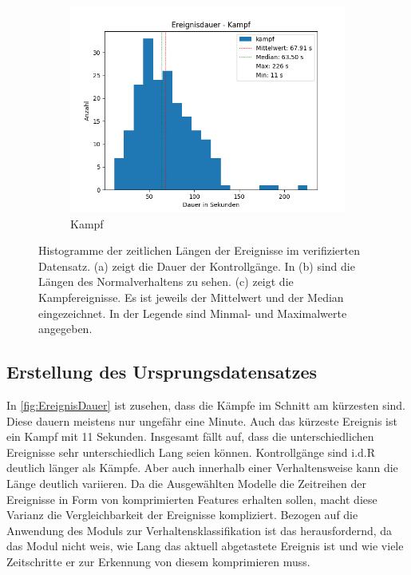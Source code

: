 \begin{figure}[htbp]
    \begin{subfigure}{.6\textwidth}
        \centering
        \includegraphics[width=1\linewidth]{img//Ereignisdauer/Auswertung Ereignisdauer kampf.png}
        \caption{Kampf}
        \label{fig:DauerNormal}
    \end{subfigure}
    \caption[Histogramme der zeitlichen Längen der Ereignisse im verifizierten Datensatz.]{Histogramme der zeitlichen Längen der Ereignisse im verifizierten Datensatz. (a) zeigt die Dauer der Kontrollgänge. In (b) sind die Längen des Normalverhaltens zu sehen. (c) zeigt die Kampfereignisse. Es ist jeweils der Mittelwert und der Median eingezeichnet. In der Legende sind Minmal- und Maximalwerte angegeben.}
    \label{fig:EreignisDauer}
\end{figure}

\subsection{Erstellung des Ursprungsdatensatzes}
In \autoref{fig:EreignisDauer} ist zusehen, dass die Kämpfe im Schnitt am kürzesten sind. Diese dauern meistens nur ungefähr eine Minute. Auch das kürzeste Ereignis ist ein Kampf mit 11 Sekunden. Insgesamt fällt auf, dass die unterschiedlichen Ereignisse sehr unterschiedlich Lang seien können. Kontrollgänge sind i.d.R deutlich länger als Kämpfe. Aber auch innerhalb einer Verhaltensweise kann die Länge deutlich variieren. Da die Ausgewählten Modelle die Zeitreihen der Ereignisse in Form von komprimierten Features erhalten sollen, macht diese Varianz die Vergleichbarkeit der Ereignisse kompliziert. Bezogen auf die Anwendung des Moduls zur Verhaltensklassifikation ist das herausfordernd, da das Modul nicht weis, wie Lang das aktuell abgetastete Ereignis ist und wie viele Zeitschritte er zur Erkennung von diesem komprimieren muss. \par

